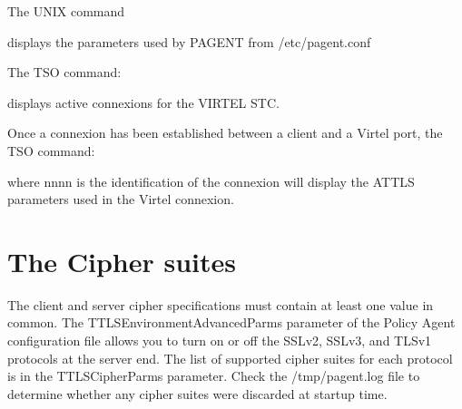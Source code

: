 \documentclass[letterpaper,10pt,english]{sphinxmanual}
\begin{document}
\sphinxAtStartPar
The UNIX command

\begin{sphinxVerbatim}[commandchars=\\\{\}]
\end{sphinxVerbatim}

\sphinxAtStartPar
displays the parameters used by PAGENT from /etc/pagent.conf

\sphinxAtStartPar
The TSO command:\sphinxhyphen{}

\begin{sphinxVerbatim}[commandchars=\\\{\}]
 
\end{sphinxVerbatim}

\sphinxAtStartPar
displays active connexions for the VIRTEL STC.

\sphinxAtStartPar
Once a connexion has been established between a client and a Virtel port, the TSO command:\sphinxhyphen{}

\begin{sphinxVerbatim}[commandchars=\\\{\}]
    
\end{sphinxVerbatim}

\sphinxAtStartPar
where nnnn is the identification of the connexion will display the AT\sphinxhyphen{}TLS parameters used in the Virtel connexion.

\newpage

\ignorespaces 

\section{The Cipher suites}
\label{\detokenize{connectivity_guide:the-cipher-suites}}\label{\detokenize{connectivity_guide:index-166}}
\sphinxAtStartPar
The client and server cipher specifications must contain at least one value in common. The TTLSEnvironmentAdvancedParms parameter of the Policy Agent configuration file allows you to turn on or off the SSLv2, SSLv3, and TLSv1 protocols at the server end. The list of supported cipher suites for each protocol is in the TTLSCipherParms parameter. Check the /tmp/pagent.log file to determine whether any cipher suites were discarded at startup time.
\end{document}
